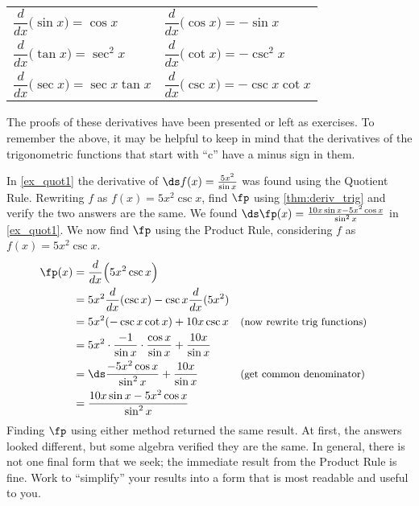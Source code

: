 \begin{theorem}\label{thm:deriv_trig}
\begin{anywhereenum}
\renewcommand{\arraystretch}{2.2}
	\begin{tabular}{ll}
		\item	$\dfrac{d}{dx}\bigl(\sin x\bigr) = \cos x$ &
		\item	$\dfrac{d}{dx}\bigl(\cos x\bigr) = -\sin x$ \\
		\item	$\dfrac{d}{dx}\bigl(\tan x\bigr) = \sec^2 x$ \qquad\quad\null&
		\item	$\dfrac{d}{dx}\bigl(\cot x\bigr) = -\csc^2 x$ \\
		\item	$\dfrac{d}{dx}\bigl(\sec x\bigr) = \sec x\tan x$ &
		\item	$\dfrac{d}{dx}\bigl(\csc x\bigr) = -\csc x\cot x$
	\end{tabular}
\end{anywhereenum}
\end{theorem}

The proofs of these derivatives have been presented or left as exercises. To remember the above, it may be helpful to keep in mind that the derivatives of the trigonometric functions that start with ``c'' have a minus sign in them.

\begin{example}\label{ex_prod_quot}
In \autoref{ex_quot1} the derivative of $\ds f(x) = \frac{5x^2}{\sin x}$ was found using the Quotient Rule. Rewriting $f$ as $f(x) = 5x^2\csc x$, find $\fp$ using \autoref{thm:deriv_trig} and verify the two answers are the same.
\solution
We found $\ds \fp(x) = \frac{10x\sin x - 5x^2\cos x}{\sin^2 x}$ in \autoref{ex_quot1}. We now find $\fp$ using the Product Rule, considering $f$ as $f(x) = 5x^2\csc x$.
\begin{align*}
	\fp(x)
	&= \frac{d}{dx}\Bigl(5x^2\csc x\Bigr) \\
	& = 5x^2 \frac{d}{dx} (\csc x) - \csc x \frac{d}{dx}(5x^2) \\
	&= 5x^2(-\csc x\cot x) + 10x\csc x && \text{\small (now rewrite trig functions)}\\
	&= 5x^2\cdot \frac{-1}{\sin x}\cdot \frac{\cos x}{\sin x} + \frac{10x}{\sin x}\\
	&= \ds\frac{-5x^2\cos x}{\sin ^2x}+\frac{10x}{\sin x} && \text{\small (get common denominator)}\\
	&= \frac{10x\sin x - 5x^2\cos x}{\sin^2x}
\end{align*}
Finding $\fp$ using either method returned the same result. At first, the answers looked different, but some algebra verified they are the same. In general, there is not one final form that we seek; the immediate result from the Product Rule is fine. Work to ``simplify\primeskip'' your results into a form that is most readable and useful to you.
\end{example}

